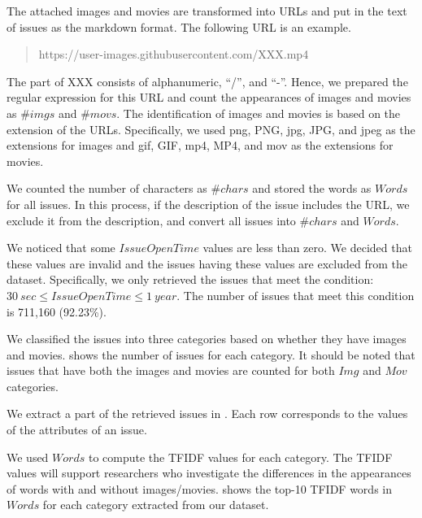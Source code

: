 The attached images and movies are transformed into 
URLs and put in the text of issues as the markdown format. 
The following URL is an example.

\begin{quote}
	https://user-images.githubusercontent.com/XXX.mp4
\end{quote}

\noindent{}
The part of XXX consists of alphanumeric, ``/'', and ``-''.
Hence, we prepared the regular expression for this URL and 
count the appearances of images and movies as $\#imgs$ and $\#movs$. 
The identification of images and movies is based on the extension of 
the URLs. 
Specifically, we used png, PNG, jpg, JPG, and jpeg as 
the extensions for images and 
gif, GIF, mp4, MP4, and mov as the extensions for movies.

We counted the number of characters as $\#chars$ and 
stored the words as $Words$ for all issues. 
In this process, if the description of the issue 
includes the URL, we exclude it from the description, 
and convert all issues into $\#chars$ and $Words$.

We noticed that some $IssueOpenTime$ values are less than zero. 
We decided that these values are invalid and the issues having 
these values are excluded from the dataset. 
Specifically, we only retrieved the issues that meet 
the condition: $30\ sec \leq IssueOpenTime \leq 1\ year$.
The number of issues that meet this condition is 711,160 (92.23\%).



We classified the issues into three categories based on 
whether they have images and movies. 
 shows the number of issues for each category. 
It should be noted that issues that have both 
the images and movies are counted for both 
$Img$ and $Mov$ categories. 



We extract a part of the retrieved issues in . 
Each row corresponds to the values of the attributes of an issue. 



We used $Words$ to compute the TFIDF values for each category. 
The TFIDF values will support researchers who investigate 
the differences in the appearances of words with and without 
images/movies. 
 shows the top-10 TFIDF words in $Words$ 
for each category extracted from our dataset. 

